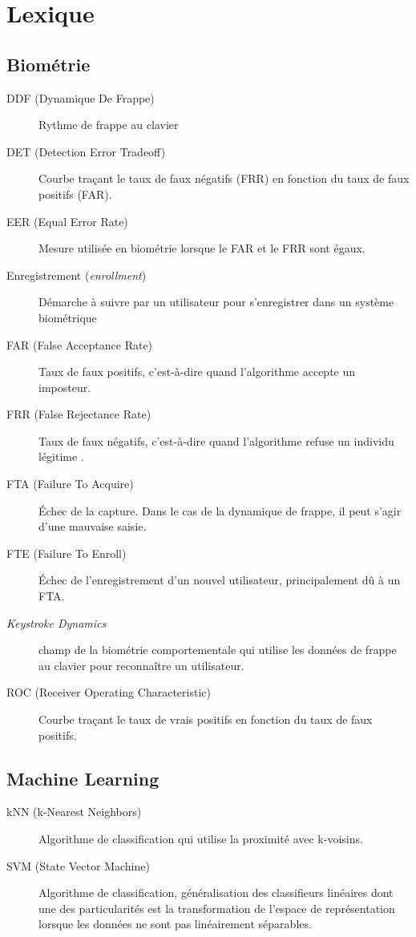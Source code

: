 \section{Lexique}

\subsection{Biométrie}

\begin{description}
  \item[DDF (Dynamique De Frappe)] Rythme de frappe au clavier
  \item[DET (Detection Error Tradeoff)] Courbe traçant le taux de faux négatifs (FRR) en fonction du taux de faux positifs (FAR).
  \item[EER (Equal Error Rate)] Mesure utilisée en biométrie lorsque le FAR et le FRR sont égaux.
  \item[Enregistrement (\textit{enrollment})] Démarche à suivre par un utilisateur pour s'enregistrer dans un système biométrique
  \item[FAR (False Acceptance Rate)] Taux de faux positifs, c'est-à-dire quand l'algorithme accepte un imposteur.
  \item[FRR (False Rejectance Rate)] Taux de faux négatifs, c'est-à-dire quand l'algorithme refuse un individu légitime .
  \item[FTA (Failure To Acquire)] Échec de la capture. Dans le cas de la dynamique de frappe, il peut s'agir d'une mauvaise saisie.
  \item[FTE (Failure To Enroll)] Échec de l'enregistrement d'un nouvel utilisateur, principalement dû à un FTA.
  \item[\textit{Keystroke Dynamics}] champ de la biométrie comportementale qui utilise les données de frappe au clavier pour reconnaître un utilisateur.
  \item[ROC (Receiver Operating Characteristic)] Courbe traçant le taux de vrais positifs en fonction du taux de faux positifs.
\end{description}

\subsection{Machine Learning}

\begin{description}
  \item[kNN (k-Nearest Neighbors)] Algorithme de classification qui utilise la proximité avec k-voisins.
  \item[SVM (State Vector Machine)] Algorithme de classification, généralisation des classifieurs linéaires dont une des particularités est la transformation de l'espace de représentation lorsque les données ne sont pas linéairement séparables. 
\end{description}

